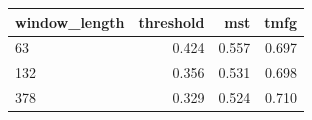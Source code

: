 \begin{tabular}{lrrr}
\toprule
window\_length & threshold & mst & tmfg \\
\midrule
63 & 0.424 & 0.557 & 0.697 \\
132 & 0.356 & 0.531 & 0.698 \\
378 & 0.329 & 0.524 & 0.710 \\
\bottomrule
\end{tabular}
